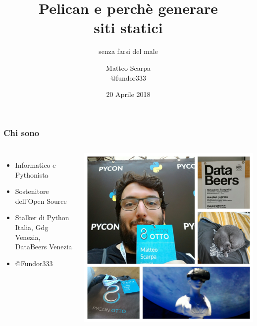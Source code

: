 
\title{Pelican e perchè generare\\ siti statici}
\subtitle{senza farsi del male}
\date{20 Aprile 2018}
\author{Matteo Scarpa \\ @fundor333}



\frame{\maketitle}

\begin{frame}
	\frametitle{Chi sono}
	\begin{columns}
		\begin{itemize}
			\item Informatico e Pythonista
			\item Sostenitore dell'Open Source
			\item Stalker di Python Italia, Gdg Venezia, DataBeers Venezia
			\item @Fundor333
		\end{itemize}
		\includegraphics[scale=0.08]{img/foto}
	\end{columns}
\end{frame}


